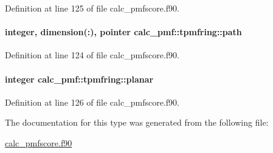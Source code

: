 Definition at line 125 of file calc\-\_\-pmfscore.\-f90.

\hypertarget{structcalc__pmf_1_1tpmfring_a59898428901298bc367bfa1d5f9f1213}{
\paragraph[{path}]{\setlength{\rightskip}{0pt plus 5cm}integer, dimension(\-:), pointer calc\-\_\-pmf\-::tpmfring\-::path}}\label{structcalc__pmf_1_1tpmfring_a59898428901298bc367bfa1d5f9f1213}


Definition at line 124 of file calc\-\_\-pmfscore.\-f90.

\hypertarget{structcalc__pmf_1_1tpmfring_a2daea6db79515a281dc692fafce9a7c8}{
\paragraph[{planar}]{\setlength{\rightskip}{0pt plus 5cm}integer calc\-\_\-pmf\-::tpmfring\-::planar}}\label{structcalc__pmf_1_1tpmfring_a2daea6db79515a281dc692fafce9a7c8}


Definition at line 126 of file calc\-\_\-pmfscore.\-f90.



The documentation for this type was generated from the following file\-:\begin{DoxyCompactItemize}
\item 
\hyperlink{calc__pmfscore_8f90}{calc\-\_\-pmfscore.\-f90}\end{DoxyCompactItemize}

